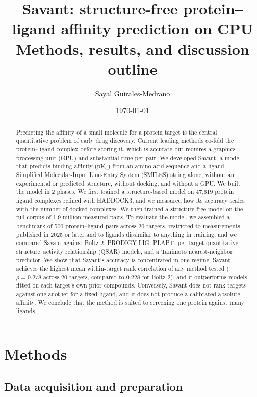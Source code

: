 \documentclass[11pt]{article}
\title{Savant: structure-free protein--ligand affinity prediction on CPU\\
\large Methods, results, and discussion outline}
\author{Sayal Guirales-Medrano}
\date{\today}
\newcommand{\pkd}{\ensuremath{\mathrm{pK_d}}}
\begin{document}
\maketitle

\begin{abstract}
\noindent
Predicting the affinity of a small molecule for a protein target is the central
quantitative problem of early drug discovery. Current leading methods co-fold
the protein--ligand complex before scoring it, which is accurate but requires a
graphics processing unit (GPU) and substantial time per pair. We developed
Savant, a model that predicts binding affinity (\pkd) from an amino acid
sequence and a ligand Simplified Molecular-Input Line-Entry System (SMILES)
string alone, without an experimental or predicted structure, without docking,
and without a GPU. We built the model in 2 phases. We first trained a
structure-based model on 47,619 protein--ligand complexes refined with
HADDOCK3, and we measured how its accuracy scales with the number of docked
complexes. We then trained a structure-free model on the full corpus of 1.9
million measured pairs. To evaluate the model, we assembled a benchmark of 500
protein--ligand pairs across 20 targets, restricted to measurements published
in 2025 or later and to ligands dissimilar to anything in training, and we
compared Savant against Boltz-2, PRODIGY-LIG, PLAPT, per-target quantitative
structure--activity relationship (QSAR) models, and a Tanimoto nearest-neighbor
predictor. We show that Savant's accuracy is concentrated in one regime. Savant
achieves the highest mean within-target rank correlation of any method tested
($\rho = 0.278$ across 20 targets, compared to 0.228 for Boltz-2), and it
outperforms models fitted on each target's own prior compounds. Conversely,
Savant does not rank targets against one another for a fixed ligand, and it
does not produce a calibrated absolute affinity. We conclude that the method is
suited to screening one protein against many ligands.
\end{abstract}

\tableofcontents

\section{Methods}

\subsection{Data acquisition and preparation}
\end{document}
